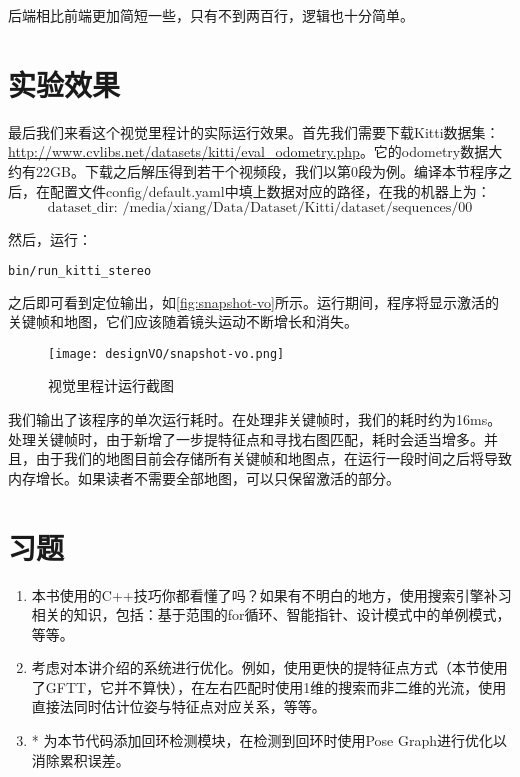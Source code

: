后端相比前端更加简短一些，只有不到两百行，逻辑也十分简单。

\section{实验效果}
最后我们来看这个视觉里程计的实际运行效果。首先我们需要下载Kitti数据集：\url{http://www.cvlibs.net/datasets/kitti/eval_odometry.php}。它的odometry数据大约有22GB。下载之后解压得到若干个视频段，我们以第0段为例。编译本节程序之后，在配置文件config/default.yaml中填上数据对应的路径，在我的机器上为：
$$\text{dataset_dir: /media/xiang/Data/Dataset/Kitti/dataset/sequences/00}$$

然后，运行：
\begin{lstlisting}[language=sh,caption=终端输入：]
bin/run_kitti_stereo
\end{lstlisting}
之后即可看到定位输出，如\autoref{fig:snapshot-vo}所示。运行期间，程序将显示激活的关键帧和地图，它们应该随着镜头运动不断增长和消失。

\begin{figure}[!htp]
    \centering    
    \texttt{[image: designVO/snapshot-vo.png]}\\
    \caption{视觉里程计运行截图}
    \label{fig:snapshot-vo}
\end{figure}

我们输出了该程序的单次运行耗时。在处理非关键帧时，我们的耗时约为16ms。处理关键帧时，由于新增了一步提特征点和寻找右图匹配，耗时会适当增多。并且，由于我们的地图目前会存储所有关键帧和地图点，在运行一段时间之后将导致内存增长。如果读者不需要全部地图，可以只保留激活的部分。

\section*{习题}
\begin{enumerate}
	\item 本书使用的C++技巧你都看懂了吗？如果有不明白的地方，使用搜索引擎补习相关的知识，包括：基于范围的for循环、智能指针、设计模式中的单例模式，等等。
	\item 考虑对本讲介绍的系统进行优化。例如，使用更快的提特征点方式（本节使用了GFTT，它并不算快），在左右匹配时使用1维的搜索而非二维的光流，使用直接法同时估计位姿与特征点对应关系，等等。
    \item* 为本节代码添加回环检测模块，在检测到回环时使用Pose Graph进行优化以消除累积误差。
\end{enumerate}
